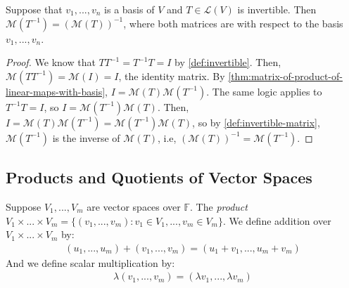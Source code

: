 \documentclass{article}
\begin{document}
\begin{theorem}
  \label{thm:matrix-of-inverse-equals-inverse-of-matrix}
  Suppose that $v_1, ..., v_n$ is a basis of $V$ and $T \in
  \mathcal{L}(V)$ is invertible. Then $\mathcal{M}(T^{-1}) =
  (\mathcal{M}(T))^{-1}$, where both matrices are with respect to the
  basis $v_1, ..., v_n$.
\end{theorem}
\begin{proof}
  We know that $TT^{-1} = T^{-1}T = I$ by \cref{def:invertible}. Then,
  $\mathcal{M}(TT^{-1}) = \mathcal{M}(I) = I$, the identity matrix. By
  \cref{thm:matrix-of-product-of-linear-maps-with-basis}, $I =
  \mathcal{M}(T)\mathcal{M}(T^{-1})$. The same logic applies to
  $T^{-1}T = I$, so $I = \mathcal{M}(T^{-1})\mathcal{M}(T)$. Then, $I
  = \mathcal{M}(T) \mathcal{M}(T^{-1}) = \mathcal{M}(T^{-1})
  \mathcal{M}(T)$, so by \cref{def:invertible-matrix},
  $\mathcal{M}(T^{-1})$ is the inverse of $\mathcal{M}(T)$, i.e,
  $(\mathcal{M}(T))^{-1} = \mathcal{M}(T^{-1})$.
\end{proof}


\subsection{Products and Quotients of Vector Spaces}

\begin{definition}
  Suppose $V_1, ..., V_m$ are vector spaces over $\mathbb{F}$. The
  \textit{product} $V_1 \times ... \times V_m = \{ (v_1, ..., v_m):
  v_1 \in V_1, ..., v_m \in V_m \}$. We define addition over $V_1
  \times ... \times V_m$ by:
  \begin{align*}
    (u_1, ..., u_m) + (v_1, ..., v_m) = (u_1 + v_1, ..., u_m + v_m)
  \end{align*}
  And we define scalar multiplication by:
  \begin{align*}
    \lambda(v_1, ..., v_m) = (\lambda v_1, ..., \lambda v_m)
  \end{align*}
\end{definition}
\end{document}
